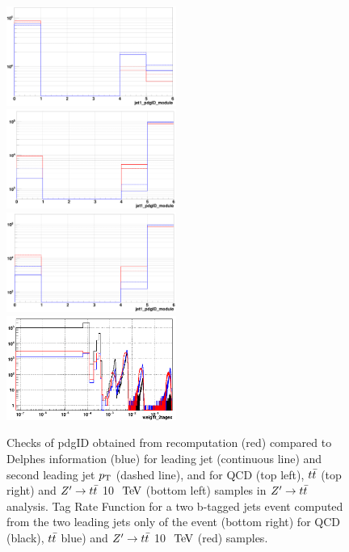 \documentclass{cernrep}
\begin{document}
\begin{figure}[!htb]\centering
\includegraphics[width=0.495\textwidth]{Fig/Zptt/check_TRF/jet12pdgID_QCD5f_redModule_blueDELPHES.png}
\includegraphics[width=0.495\textwidth]{Fig/Zptt/check_TRF/jet12pdgID_ttbar_redModule_blueDELPHES.png}
\includegraphics[width=0.495\textwidth]{Fig/Zptt/check_TRF/jet12pdgID_Zptt10TeV_redModule_blueDELPHES.png}
\includegraphics[width=0.495\textwidth]{Fig/Zptt/check_TRF/TRF2tagex_module_redZptt10TeV_blackQCD_bluettbar.png}
\caption{Checks of pdgID obtained from recomputation (red) compared to Delphes information (blue) for leading jet (continuous line) and second leading jet $p\sb{\scriptstyle\mathrm{T}}$ (dashed line), and for QCD (top left), $t\bar{t}$ (top right) and $Z^{\prime} \rightarrow t\bar{t}$ 10 $\TeV$ (bottom left) samples in $Z^{\prime} \rightarrow t\bar{t}$ analysis. Tag Rate Function for a two b-tagged jets event computed from the two leading jets only of the event (bottom right) for QCD (black), $t\bar{t}$ blue) and $Z^{\prime} \rightarrow t\bar{t}$ 10 $\TeV$ (red) samples.}
\label{fig:Zptt_TRFchecks}
\end{figure}
\end{document}
